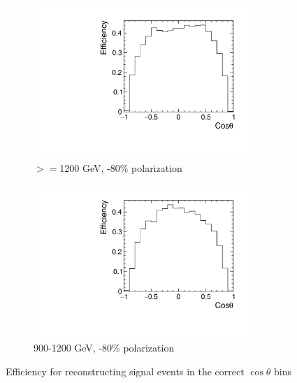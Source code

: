 \begin{figure}
  \centering
  \begin{subfigure}{.5\textwidth}
    \centering
    \includegraphics[width=0.9\textwidth]{TopAnalysis/figures/efficiency_HighE.pdf}
    \caption{$>=$1200 GeV, -80\% polarization}
  \end{subfigure}%
  \begin{subfigure}{.5\textwidth}
    \centering
    \includegraphics[width=0.9\textwidth]{TopAnalysis/figures/efficiency_MidE.pdf}
    \caption{900-1200 GeV, -80\% polarization}
  \end{subfigure}
  \caption{Efficiency for reconstructing signal events in the correct $\cos\theta$ bins}
  \label{fig:sigefficienciesa}
\end{figure}

